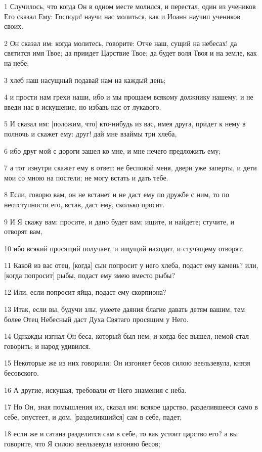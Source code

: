 \par 1 Случилось, что когда Он в одном месте молился, и перестал, один из учеников Его сказал Ему: Господи! научи нас молиться, как и Иоанн научил учеников своих.
\par 2 Он сказал им: когда молитесь, говорите: Отче наш, сущий на небесах! да святится имя Твое; да приидет Царствие Твое; да будет воля Твоя и на земле, как на небе;
\par 3 хлеб наш насущный подавай нам на каждый день;
\par 4 и прости нам грехи наши, ибо и мы прощаем всякому должнику нашему; и не введи нас в искушение, но избавь нас от лукавого.
\par 5 И сказал им: [положим, что] кто-нибудь из вас, имея друга, придет к нему в полночь и скажет ему: друг! дай мне взаймы три хлеба,
\par 6 ибо друг мой с дороги зашел ко мне, и мне нечего предложить ему;
\par 7 а тот изнутри скажет ему в ответ: не беспокой меня, двери уже заперты, и дети мои со мною на постели; не могу встать и дать тебе.
\par 8 Если, говорю вам, он не встанет и не даст ему по дружбе с ним, то по неотступности его, встав, даст ему, сколько просит.
\par 9 И Я скажу вам: просите, и дано будет вам; ищите, и найдете; стучите, и отворят вам,
\par 10 ибо всякий просящий получает, и ищущий находит, и стучащему отворят.
\par 11 Какой из вас отец, [когда] сын попросит у него хлеба, подаст ему камень? или, [когда попросит] рыбы, подаст ему змею вместо рыбы?
\par 12 Или, если попросит яйца, подаст ему скорпиона?
\par 13 Итак, если вы, будучи злы, умеете даяния благие давать детям вашим, тем более Отец Небесный даст Духа Святаго просящим у Него.
\par 14 Однажды изгнал Он беса, который был нем; и когда бес вышел, немой стал говорить; и народ удивился.
\par 15 Некоторые же из них говорили: Он изгоняет бесов силою веельзевула, князя бесовского.
\par 16 А другие, искушая, требовали от Него знамения с неба.
\par 17 Но Он, зная помышления их, сказал им: всякое царство, разделившееся само в себе, опустеет, и дом, [разделившийся] сам в себе, падет;
\par 18 если же и сатана разделится сам в себе, то как устоит царство его? а вы говорите, что Я силою веельзевула изгоняю бесов;
